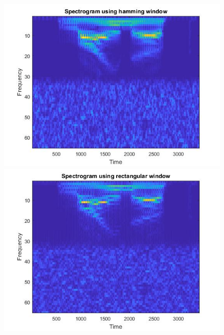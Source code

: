 \documentclass{article}
\begin{document}
\begin{figure}[H]

\includegraphics[scale = .5]{report8_1}
\includegraphics[scale = .5]{report8_2}
\\
\end{figure}
\end{document}
